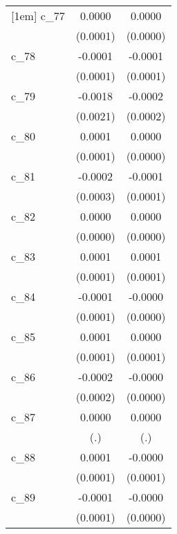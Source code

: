 {\begin{tabular}{l*{2}{c}}
[1em]
c\_77        &      0.0000        &      0.0000        \\
            &    (0.0001)        &    (0.0000)        \\
[1em]
c\_78        &     -0.0001        &     -0.0001        \\
            &    (0.0001)        &    (0.0001)        \\
[1em]
c\_79        &     -0.0018        &     -0.0002        \\
            &    (0.0021)        &    (0.0002)        \\
[1em]
c\_80        &      0.0001        &      0.0000        \\
            &    (0.0001)        &    (0.0000)        \\
[1em]
c\_81        &     -0.0002        &     -0.0001        \\
            &    (0.0003)        &    (0.0001)        \\
[1em]
c\_82        &      0.0000        &      0.0000        \\
            &    (0.0000)        &    (0.0000)        \\
[1em]
c\_83        &      0.0001        &      0.0001        \\
            &    (0.0001)        &    (0.0001)        \\
[1em]
c\_84        &     -0.0001        &     -0.0000        \\
            &    (0.0001)        &    (0.0000)        \\
[1em]
c\_85        &      0.0001        &      0.0000        \\
            &    (0.0001)        &    (0.0001)        \\
[1em]
c\_86        &     -0.0002        &     -0.0000        \\
            &    (0.0002)        &    (0.0000)        \\
[1em]
c\_87        &      0.0000        &      0.0000        \\
            &         (.)        &         (.)        \\
[1em]
c\_88        &      0.0001        &     -0.0000        \\
            &    (0.0001)        &    (0.0001)        \\
[1em]
c\_89        &     -0.0001        &     -0.0000        \\
            &    (0.0001)        &    (0.0000)        \\

\end{tabular}}
